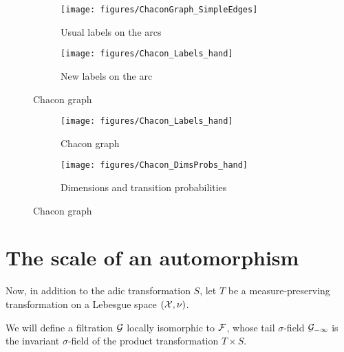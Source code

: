 \documentclass[12pt,a4paper]{article}
\begin{document}
\begin{figure}[!h]
   \centering
   \begin{subfigure}[t]{0.47\textwidth}
   \centering
   	\texttt{[image: figures/ChaconGraph\_SimpleEdges]}
 		\caption{\footnotesize Usual labels on the arcs}\label{fig:ChaconGraph_simpleedges}
    \end{subfigure}              
   \quad
    \begin{subfigure}[t]{0.47\textwidth}
    \centering
   	\texttt{[image: figures/Chacon\_Labels\_hand]}
 		\caption{\footnotesize New labels on the arc}\label{fig:ChaconGraph_newlabs}
 	\end{subfigure}      

   \caption{Chacon graph}
   \label{fig:ChaconGraph}
 \end{figure}


\begin{figure}[!h]
   \centering
   \begin{subfigure}[t]{0.47\textwidth}
   \centering
   	\texttt{[image: figures/Chacon\_Labels\_hand]}
 		\caption{\footnotesize Chacon graph}\label{fig:ChaconLabels}
    \end{subfigure}              
   \quad
    \begin{subfigure}[t]{0.47\textwidth}
    \centering
   	\texttt{[image: figures/Chacon\_DimsProbs\_hand]}
 		\caption{\footnotesize Dimensions and transition probabilities}\label{fig:ChaconDimsProbs}
 	\end{subfigure}      

   \caption{Chacon graph}\label{fig:ChaconGraph}
 \end{figure}



\section{The scale of an automorphism}


Now, in addition to the adic transformation $S$, let $T$ be a measure-preserving transformation on a Lebesgue space $(\mathcal{X}, \nu)$. 

We will define a filtration $\mathcal{G}$ locally isomorphic to $\mathcal{F}$, whose 
tail $\sigma$-field $\mathcal{G}_{-\infty}$ is the invariant $\sigma$-field of 
the product transformation $T \times S$. 


\end{document}
